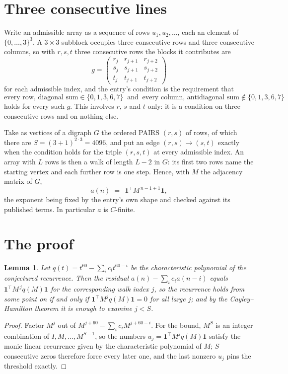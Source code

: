 \documentclass[11pt,a4paper]{article}
\theoremstyle{plain}
\newtheorem{lemma}[theorem]{Lemma}
\theoremstyle{definition}
\begin{document}
\section{Three consecutive lines}

Write an admissible array as a sequence of rows $u_1,u_2,\dots$, each an element of
$\{0,\dots,3\}^{3}$. A $3\times3$ subblock occupies three consecutive rows and
three consecutive columns, so with $r,s,t$ three consecutive rows the blocks it
contributes are
\[
g=\begin{pmatrix}r_j&r_{j+1}&r_{j+2}\\ s_j&s_{j+1}&s_{j+2}\\ t_j&t_{j+1}&t_{j+2}\end{pmatrix}
\]
for each admissible index, and the entry's condition is the requirement that
\[
\text{every row, diagonal sum} \in \{0,1,3,6,7\}\ \text{ and }\ \text{every column, antidiagonal sum} \notin \{0,1,3,6,7\}
\]
holds for every such $g$. This involves $r$, $s$ and $t$ only: it is a condition on
three consecutive rows and on nothing else.

Take as vertices of a digraph $G$ the ordered PAIRS $(r,s)$ of rows, of which there are
$S=(3+1)^{2\cdot3}=4096$, and put an edge $(r,s)\to(s,t)$ exactly when the condition
holds for the triple $(r,s,t)$ at every admissible index. An array with $L$ rows is then a
walk of length $L-2$ in $G$: its first two rows name the starting vertex and each further
row is one step. Hence, with $M$ the adjacency matrix of $G$,
\[
a(n)\;=\;\,\mathbf{1}^{\!\top}M^{\,n-1+1}\mathbf{1},
\]
the exponent being fixed by the entry's own shape and checked against its published terms.
In particular $a$ is $C$-finite.

\section{The proof}

\begin{lemma}\label{lem:crit}
Let $q(t)=t^{60}-\sum_i c_it^{60-i}$ be the characteristic polynomial of the
conjectured recurrence. Then the residual $a(n)-\sum_ic_ia(n-i)$ equals
$\mathbf{1}^{\!\top}M^{\,j}q(M)\mathbf{1}$ for the corresponding walk index
$j$, so the recurrence holds from some point on if and only if
$\mathbf{1}^{\!\top}M^{j}q(M)\mathbf{1}=0$ for all large $j$; and by the
Cayley--Hamilton theorem it is enough to examine $j<S$.
\end{lemma}

\begin{proof}
Factor $M^{j}$ out of $M^{j+60}-\sum_ic_iM^{j+60-i}$. For the bound, $M^{S}$
is an integer combination of $I,M,\dots,M^{S-1}$, so the numbers
$u_j=\mathbf{1}^{\!\top}M^{j}q(M)\mathbf{1}$ satisfy the monic linear recurrence given by
the characteristic polynomial of $M$; $S$ consecutive zeros therefore force every later one,
and the last nonzero $u_j$ pins the threshold exactly.
\end{proof}
\end{document}
